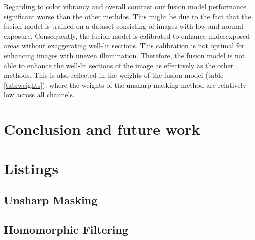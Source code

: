 \documentclass[sigconf]{acmart}
\begin{document}
Regarding to color vibrancy and overall contrast our fusion model performance significant worse than the other methdos. This might be due to the fact that the fusion model is trained on a dataset consisting of images with low and normal exposure. Consequently, the fusion model is calibrated to enhance underexposed areas without exaggerating well-lit sections. This calibration is not optimal for enhancing images with uneven illumination. Therefore, the fusion model is not able to enhance the well-lit sections of the image as effectively as the other methods. This is also reflected in the weights of the fusion model (table \ref{tab:weights}), where the weights of the unsharp masking method are relatively low across all channels.

\section{Conclusion and future work}\label{sec:conclusion}













\newpage
\appendix

\section{Listings}
\subsection{Unsharp Masking}\label{sec:unsharp-listing}
\begin{mdframed}[backgroundcolor=backcolour,leftmargin=0cm,hidealllines=true,innerleftmargin=0cm,innerrightmargin=0cm,innertopmargin=0cm,innerbottommargin=-0.65cm]

\end{mdframed}

\subsection{Homomorphic Filtering}\label{sec:homomorphic-listing}
\begin{mdframed}[backgroundcolor=backcolour,leftmargin=0cm,hidealllines=true,innerleftmargin=0cm,innerrightmargin=0cm,innertopmargin=0cm,innerbottommargin=-0.65cm]

\end{mdframed}
\end{document}
